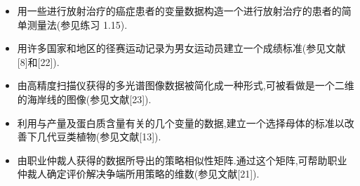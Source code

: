 
\begin{itemize}[leftmargin=*,itemsep=2pt]
\item 用一些进行放射治疗的癌症患者的变量数据构造一个进行放射治疗的患者的简单测量法(参见练习 1.15).
\item 用许多国家和地区的径赛运动记录为男女运动员建立一个成绩标准(参见文献[8]和[22]).
\item 由高精度扫描仪获得的多光谱图像数据被简化成一种形式,可被看做是一个二维的海岸线的图像(参见文献[23]).
\item 利用与产量及蛋白质含量有关的几个变量的数据,建立一个选择母体的标准以改善下几代豆类植物(参见文献[13]).
\item 由职业仲裁人获得的数据所导出的策略相似性矩阵.通过这个矩阵,可帮助职业仲裁人确定评价解决争端所用策略的维数(参见文献[21]).
\end{itemize}
